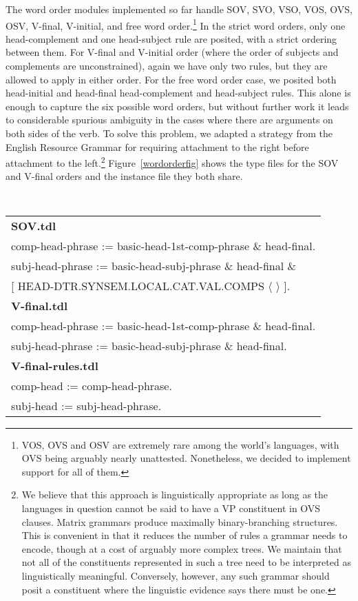 The word order modules implemented so far handle 
SOV, SVO, VSO, VOS, OVS, OSV, V-final, V-initial, and
free word order.\footnote{VOS, OVS and OSV are extremely rare among
the world's languages, with OVS being arguably nearly unattested.
Nonetheless, we decided to implement support for all of them.}  In the
strict word orders, only one head-complement and one head-subject rule
are posited, with a strict ordering between them.  For V-final and
V-initial order (where the order of subjects and complements are
unconstrained), again we have only two rules, but they are allowed to
apply in either order.  For the free word order case, we posited both
head-initial and head-final head-complement and head-subject rules.
This alone is enough to capture the six possible word orders, but
without further work it leads to considerable spurious ambiguity in
the cases where there are arguments on both sides of the verb.  To
solve this problem, we adapted a strategy from the English Resource
Grammar for requiring attachment to the right before attachment to the
left.\footnote{We believe that this approach is linguistically
appropriate as long as the languages in question cannot be said to
have a VP constituent in OVS clauses.  Matrix grammars produce
maximally binary-branching structures.  This is convenient in that it
reduces the number of rules a grammar needs to encode, though at a
cost of arguably more complex trees.  We maintain that not all of the
constituents represented in such a tree need to be interpreted as
linguistically meaningful.  Conversely, however, any such grammar
should posit a constituent where the linguistic evidence says there
must be one.}
Figure~\ref{wordorderfig} shows the type files for the SOV and
V-final orders and the instance file they both share.

\begin{figure*}[ht]
\begin{center}
{\tt\small
\begin{tabular}{l}
\hline
{\bf SOV.tdl}\\
comp-head-phrase := basic-head-1st-comp-phrase \& head-final.\\
subj-head-phrase := basic-head-subj-phrase \& head-final \&\\
   \phantom{foo}[ HEAD-DTR.SYNSEM.LOCAL.CAT.VAL.COMPS $\langle$ $\rangle$ ].\\
{\bf V-final.tdl}\\
comp-head-phrase := basic-head-1st-comp-phrase \& head-final.\\
subj-head-phrase := basic-head-subj-phrase \& head-final.\\
{\bf V-final-rules.tdl}\\
comp-head := comp-head-phrase.\\
subj-head := subj-head-phrase.\\
\hline
\end{tabular}
}
\end{center}
\caption{SOV and V-final basic word order modules}
\label{wordorderfig}
\end{figure*}


